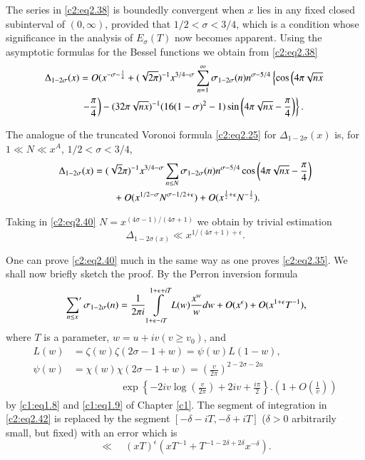The series in \eqref{c2:eq2.38} is boundedly convergent when $x$ lies
in any fixed closed subinterval of $(0, \infty)$, provided that $1/2 <
\sigma < 3/4$, which is a condition whose significance in the analysis
of $E_\sigma (T)$ now becomes apparent. Using the asymptotic formulas
for the Bessel functions we obtain from \eqref{c2:eq2.38}
\begin{align}
\Delta _{1- 2 \sigma} (x) &= O (x^{- \sigma - \frac{1}{4}}+(\sqrt{2
\pi})^{-1} x^{3/4- \sigma} \sum_{n=1}^\infty \sigma_{1- 2 \sigma}
(n) n^{\sigma- 5/4}\left\{\cos \left(4 \pi \sqrt{nx}\right.\right.\notag\\
&\left.\left. - \frac{\pi}{4}\right)- (32 \pi
\sqrt{nx})^{-1} (16(1- \sigma)^2-1) \sin \left(4 \pi \sqrt{nx} -
\frac{\pi}{4}\right)  \right\}.\label{c2:eq2.39}
\end{align}

The analogue of the truncated Voronoi formula \eqref{c2:eq2.25} for
$\Delta _{1- 2 \sigma} (x)$ is, for\pageoriginale $1 \ll N \ll x^A$,
$1/2 < \sigma < 3/4$,
\begin{align}
  \Delta _{1- 2 \sigma} (x) & = (\sqrt{2} \pi)^{-1} x^{3/4- \sigma}
  \sum_{n \leq N} \sigma_{1- 2\sigma}(n) n^{\sigma- 5/4} \cos \left(4 \pi
  \sqrt{nx} - \frac{\pi}{4}\right)\notag\\
  & \qquad + O(x^{1/2- \sigma} N^{\sigma- 1/2 + \epsilon}) + O(x^{\frac{1}{2}+  \epsilon} 
N^{- \frac{1}{2}} ).\label{c2:eq2.40}  
\end{align}

Taking in \eqref{c2:eq2.40} $N= x^{(4 \sigma -1)/(4\sigma+1)}$ we
obtain by trivial estimation 
\begin{equation}
  \Delta _{1- 2 \sigma (x)} \ll x^{1/ (4 \sigma +1)+
    \epsilon}.\label{c2:eq2.41} 
\end{equation}

One can prove \eqref{c2:eq2.40} much in the same way as one proves
\eqref{c2:eq2.35}. We shall now briefly sketch the proof. By the
Perron inversion formula
\begin{equation}
  \sideset{}{'}\sum_{n \leq x} \sigma_{1- 2 \sigma} (n) =\frac{1}{2
    \pi i} \int\limits^{1 + \epsilon + i T}_{1 + \epsilon - i T} L(w)
  \frac{x^w}{w} dw + O (x^\epsilon) + O(x^{1+ \epsilon}
  T^{-1}),\label{c2:eq2.42} 
\end{equation}
where $T$ is a parameter, $w=u + iv(v \geq v_0)$, and 
\begin{align*}
  L(w) & = \zeta (w) \zeta (2 \sigma -1 + w) = \psi (w) L (1- w),\\
  \psi(w) & = \chi (w) \chi (2 \sigma -1 + w)= \left( \frac{v}{2
    \pi}\right)^{2 - 2\sigma - 2u}\\ 
  & \hspace{2cm} \exp \left\{-2 i v \log
  \left(\frac{v}{2 \pi} \right)+ 2 i v + \frac{i \pi}{2}
  \right\}. \left(1+ O \left(\frac{1}{v}\right) \right)
\end{align*}
by \eqref{c1:eq1.8} and \eqref{c1:eq1.9} of Chapter \ref{c1}. The segment of
integration in \eqref{c2:eq2.42} is replaced by the segment $[- \delta
- iT, - \delta + iT]$ ($\delta > 0$ arbitrarily small, but fixed) with
an error which is 
$$
\ll \quad (x T)^\epsilon (x T^{-1} + T^{-1- 2 \delta + 2 \delta}x^{- \delta}).
$$

